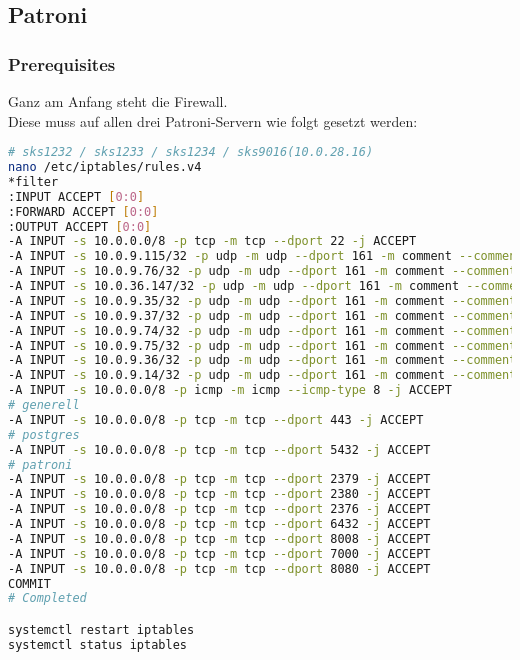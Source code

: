 
\begin{flushleft}
    \subsection{Patroni}
    \subsubsection{Prerequisites}
\end{flushleft}
\begin{flushleft}
    Ganz am Anfang steht die Firewall.\\
    Diese muss auf allen drei Patroni-Servern wie folgt gesetzt werden:
\lstset{style=gra_codestyle}
\begin{lstlisting}[language=bash, caption=Patroni - Firewall Settings,captionpos=b,label={lst:patroni-firewall-settings},breaklines=true]
# sks1232 / sks1233 / sks1234 / sks9016(10.0.28.16)
nano /etc/iptables/rules.v4
*filter
:INPUT ACCEPT [0:0]
:FORWARD ACCEPT [0:0]
:OUTPUT ACCEPT [0:0]
-A INPUT -s 10.0.0.0/8 -p tcp -m tcp --dport 22 -j ACCEPT
-A INPUT -s 10.0.9.115/32 -p udp -m udp --dport 161 -m comment --comment "Allow SNMP for probe 10.0.9.115" -j ACCEPT
-A INPUT -s 10.0.9.76/32 -p udp -m udp --dport 161 -m comment --comment "Allow SNMP for probe 10.0.9.76" -j ACCEPT
-A INPUT -s 10.0.36.147/32 -p udp -m udp --dport 161 -m comment --comment "Allow SNMP for probe 10.0.36.147" -j ACCEPT
-A INPUT -s 10.0.9.35/32 -p udp -m udp --dport 161 -m comment --comment "Allow SNMP for probe 10.0.9.35" -j ACCEPT
-A INPUT -s 10.0.9.37/32 -p udp -m udp --dport 161 -m comment --comment "Allow SNMP for probe 10.0.9.37" -j ACCEPT
-A INPUT -s 10.0.9.74/32 -p udp -m udp --dport 161 -m comment --comment "Allow SNMP for probe 10.0.9.74" -j ACCEPT
-A INPUT -s 10.0.9.75/32 -p udp -m udp --dport 161 -m comment --comment "Allow SNMP for probe 10.0.9.75" -j ACCEPT
-A INPUT -s 10.0.9.36/32 -p udp -m udp --dport 161 -m comment --comment "Allow SNMP for probe 10.0.9.36" -j ACCEPT
-A INPUT -s 10.0.9.14/32 -p udp -m udp --dport 161 -m comment --comment "Allow SNMP for probe 10.0.9.14" -j ACCEPT
-A INPUT -s 10.0.0.0/8 -p icmp -m icmp --icmp-type 8 -j ACCEPT
# generell
-A INPUT -s 10.0.0.0/8 -p tcp -m tcp --dport 443 -j ACCEPT
# postgres
-A INPUT -s 10.0.0.0/8 -p tcp -m tcp --dport 5432 -j ACCEPT
# patroni
-A INPUT -s 10.0.0.0/8 -p tcp -m tcp --dport 2379 -j ACCEPT
-A INPUT -s 10.0.0.0/8 -p tcp -m tcp --dport 2380 -j ACCEPT
-A INPUT -s 10.0.0.0/8 -p tcp -m tcp --dport 2376 -j ACCEPT
-A INPUT -s 10.0.0.0/8 -p tcp -m tcp --dport 6432 -j ACCEPT
-A INPUT -s 10.0.0.0/8 -p tcp -m tcp --dport 8008 -j ACCEPT
-A INPUT -s 10.0.0.0/8 -p tcp -m tcp --dport 7000 -j ACCEPT
-A INPUT -s 10.0.0.0/8 -p tcp -m tcp --dport 8080 -j ACCEPT
COMMIT
# Completed

systemctl restart iptables
systemctl status iptables
\end{lstlisting}
\end{flushleft}
